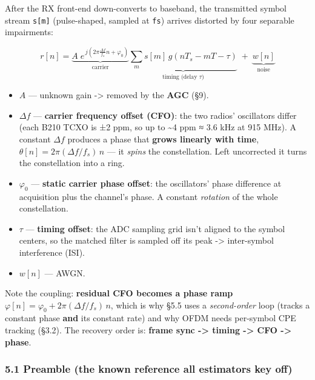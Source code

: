 \documentclass[
  10pt,
]{article}
\providecommand{\tightlist}{%
  \setlength{\itemsep}{0pt}\setlength{\parskip}{0pt}}
\begin{document}
After the RX front-end down-converts to baseband, the transmitted symbol
stream \texttt{s{[}m{]}} (pulse-shaped, sampled at \texttt{fs}) arrives
distorted by four separable impairments:

\[ r[n] = \underbrace{A\;e^{\,j\left(2\pi\frac{\Delta f}{f_s} n + \varphi_0\right)}}_{\text{carrier}}
\underbrace{\sum_m s[m]\,g\!\left(nT_s - mT - \tau\right)}_{\text{timing (delay }\tau)}
\;+\; \underbrace{w[n]}_{\text{noise}} \]

\begin{itemize}
\tightlist
\item
  \(A\) --- unknown gain -\textgreater{} removed by the \textbf{AGC}
  (§9).
\item
  \(\Delta f\) --- \textbf{carrier frequency offset (CFO)}: the two
  radios' oscillators differ (each B210 TCXO is ±2 ppm, so up to
  \textasciitilde4 ppm ≈ 3.6 kHz at 915 MHz). A constant \(\Delta f\)
  produces a phase that \textbf{grows linearly with time},
  \(\theta[n] = 2\pi(\Delta f/f_s)\,n\) --- it \emph{spins} the
  constellation. Left uncorrected it turns the constellation into a
  ring.
\item
  \(\varphi_0\) --- \textbf{static carrier phase offset}: the
  oscillators' phase difference at acquisition plus the channel's phase.
  A constant \emph{rotation} of the whole constellation.
\item
  \(\tau\) --- \textbf{timing offset}: the ADC sampling grid isn't
  aligned to the symbol centers, so the matched filter is sampled off
  its peak -\textgreater{} inter-symbol interference (ISI).
\item
  \(w[n]\) --- AWGN.
\end{itemize}

Note the coupling: \textbf{residual CFO becomes a phase ramp}
\(\varphi[n] = \varphi_0 + 2\pi(\Delta f/f_s)\,n\), which is why §5.5
uses a \emph{second-order} loop (tracks a constant phase \textbf{and}
its constant rate) and why OFDM needs per-symbol CPE tracking (§3.2).
The recovery order is: \textbf{frame sync -\textgreater{} timing
-\textgreater{} CFO -\textgreater{} phase}.

\hypertarget{51-preamble-the-known-reference-all-estimators-key-off}{%
\subsubsection{5.1 Preamble (the known reference all estimators key
off)}\label{51-preamble-the-known-reference-all-estimators-key-off}}
\end{document}
